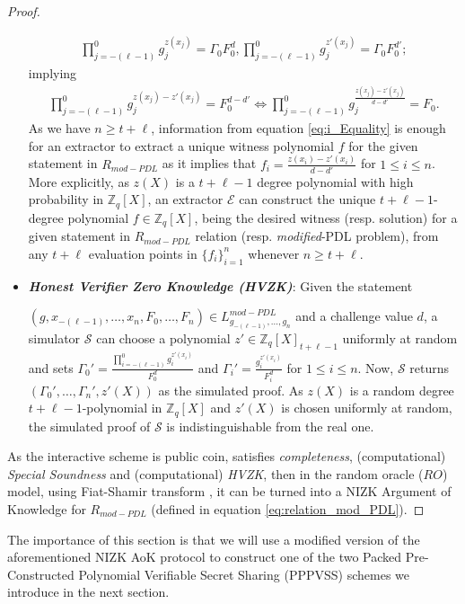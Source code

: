 \begin{proof}
\begin{itemize}
\begin{align*}
        \prod_{j=-(\ell-1)}^{0}g_j^{z(x_j)}=\Gamma_0 F_0^d,\prod_{j=-(\ell-1)}^{0}g_j^{z'(x_j)}=\Gamma_0 F_0^{d'};
      \end{align*}
      implying
      \begin{align}\label{eq:0_Equality}
        \prod_{j=-(\ell-1)}^{0}g_j^{z(x_j)-z'(x_j)}=F_0^{d-d'} \iff \prod_{j=-(\ell-1)}^{0}g_j^{\frac{z(x_j)-z'(x_j)}{d-d'}}=F_0.
      \end{align}
      As we have $n\geq t+\ell$, information from equation \ref{eq:i_Equality} is enough for 
      an extractor to extract a unique witness polynomial $f$ for the given statement in $R_{mod-PDL}$ 
      as it implies that $f_i=\frac{z(x_i)-z'(x_i)}{d-d'}$ for 
      $1\leq i\leq n$. More explicitly, as $z(X)$ is a $t+\ell-1$ degree 
      polynomial with high probability in $\mathbb{Z}_q[X]$, an extractor $\mathcal{E}$ can construct the unique $t+\ell-1$-degree 
      polynomial $f\in\mathbb{Z}_q[X]$, being the desired witness (resp. solution) for a given statement in $R_{mod-PDL}$ relation (resp. \textit{modified}-PDL problem), 
      from any $t+\ell$ evaluation points in $\{f_i\}_{i=1}^n$ whenever $n\geq t+\ell$.
    \item \textit{\textbf{Honest Verifier Zero Knowledge (HVZK)}}: Given the statement\par $(g,x_{-(\ell-1)},\dots,x_n,F_0,\dots,F_n)\in L_{g_{-(\ell-1)},\dots,g_n}^{mod-PDL}$  
      and a challenge value $d$, a simulator $\mathcal{S}$ can choose a polynomial $z'\in\mathbb{Z}_q[X]_{t+\ell-1}$ uniformly 
      at random and sets $\Gamma_0'=\frac{\prod_{i=-(\ell-1)}^{0}g_i^{z'(x_i)}}{F_0^d}$ and 
      $\Gamma_i'=\frac{g_i^{z'(x_i)}}{F_i^d}$ for $1\leq i\leq n$. 
      Now, $\mathcal{S}$ returns $(\Gamma_0',\dots,\Gamma_n',z'(X))$ as the simulated proof. As $z(X)$ is a random 
      degree $t+\ell-1$-polynomial in $\mathbb{Z}_q[X]$ and $z'(X)$ is chosen uniformly at random, 
      the simulated proof of $\mathcal{S}$ is indistinguishable from the real one.
  \end{itemize}
  As the interactive scheme is public coin, satisfies \textit{completeness}, (computational) \textit{Special Soundness} 
  and (computational) \textit{HVZK}, then in the random oracle ($RO$) model, using Fiat-Shamir transform \cite{10.1007/3-540-47721-7_12}, 
  it can be turned into a NIZK Argument of Knowledge for $R_{mod-PDL}$ (defined in equation \ref{eq:relation_mod_PDL}).
\end{proof}

The importance of this section is that we will use a modified version of the aforementioned 
NIZK AoK protocol to construct one of the two Packed Pre-Constructed Polynomial Verifiable Secret Sharing (PPPVSS) schemes 
we introduce in the next section. 


